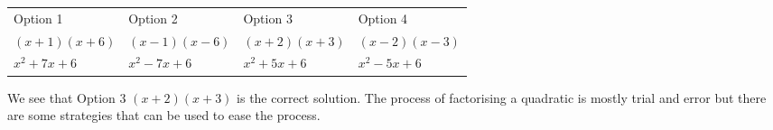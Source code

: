\begin{table}[H]
\begin{center}
\label{m39394*id276265}
\noindent
\tabletail{%
}
\tablelasttail{}
\begin{xtabular}[t]{|l|l|l|l|}\hline
Option 1 &
Option 2 &
Option 3 &
Option 4%
\tabularnewline{}
  $\left(x+1\right)\left(x+6\right)$
  &
  $\left(x-1\right)\left(x-6\right)$
  &
  $\left(x+2\right)\left(x+3\right)$
  &
  $\left(x-2\right)\left(x-3\right)$
\tabularnewline{}
  ${x}^{2}+7x+6$
  &
  ${x}^{2}-7x+6$
  &
  \uline{
    ${x}^{2}+5x+6$
  }
  &
  ${x}^{2}-5x+6$
\tabularnewline{}
\end{xtabular}
\end{center}
\end{table}
\par
\label{m39394*id276547}We see that Option 3 $(x+2)(x+3)$ is the correct solution. The process of factorising a quadratic is mostly trial and error but there are some strategies that can be used to ease the process.\par 
\label{m39394*uid20}


